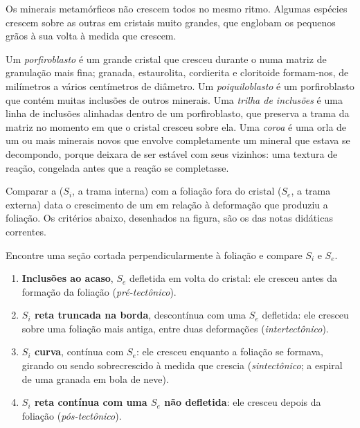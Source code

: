 Os minerais metamórficos não crescem todos no mesmo ritmo. Algumas espécies crescem sobre as outras em cristais muito grandes,
que englobam os pequenos grãos à sua volta à medida que crescem.

\begin{definition}\label{def:b2:field-lab-methods-2:porphyroblast}
Um \emph{porfiroblasto} é um grande cristal que cresceu durante o 
numa matriz de granulação mais fina; granada, estaurolita, cordierita e cloritoide formam-nos, de
milímetros a vários centímetros de diâmetro. Um \emph{poiquiloblasto} é um
porfiroblasto que contém muitas inclusões de outros minerais. Uma \emph{trilha de
inclusões} é uma linha de inclusões alinhadas dentro de um porfiroblasto, que
preserva a trama da matriz no momento em que o cristal cresceu sobre ela. Uma
\emph{coroa} é uma orla de um ou mais minerais novos que envolve completamente
um mineral que estava se decompondo, porque deixara de ser estável com seus
vizinhos: uma textura de reação, congelada antes que a reação se completasse.
\end{definition}

Comparar a  ($S_i$, a trama interna) com a foliação fora do cristal
($S_e$, a trama externa) data o crescimento de um  em relação à deformação que
produziu a foliação. Os critérios abaixo, desenhados na figura, são os das notas didáticas correntes.

\begin{method}\label{met:b2:field-lab-methods-2:timing}
Encontre uma seção cortada perpendicularmente à foliação e compare $S_i$ e $S_e$.
\begin{enumerate}
  \item \textbf{Inclusões ao acaso}, $S_e$ defletida em volta do cristal: ele cresceu antes da formação da
        foliação (\emph{pré-tectônico}).
  \item \textbf{$S_i$ reta truncada na borda}, descontínua com uma $S_e$ defletida: ele cresceu
        sobre uma foliação mais antiga, entre duas deformações (\emph{intertectônico}).
  \item \textbf{$S_i$ curva}, contínua com $S_e$: ele cresceu enquanto a foliação se formava, girando
        ou sendo sobrecrescido à medida que crescia (\emph{sintectônico}; a espiral de uma granada em bola de neve).
  \item \textbf{$S_i$ reta contínua com uma $S_e$ não defletida}: ele cresceu depois da foliação
        (\emph{pós-tectônico}).
\end{enumerate}
\end{method}

